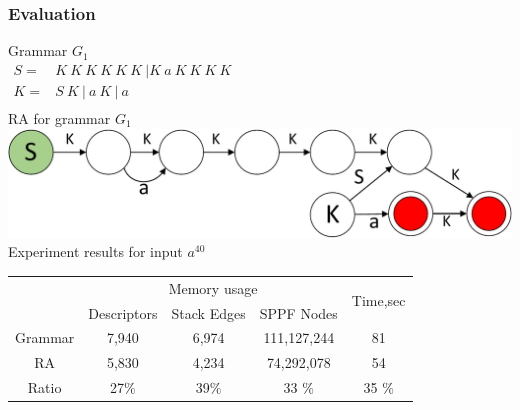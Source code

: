 \documentclass{beamer}
\begin{document}
	\begin{frame} 
		\frametitle{Evaluation}
		\begin{center}
		\vspace{-10pt}
		Grammar $G_1$\\
		\vspace{6pt}
		$
		\begin{array}{rl}
		S =& K\ K\ K\ K\ K\ K \ | K\ a\ K\ K\ K\ K \\
		K =& S\ K\ |\ a\ K\ |\ a \\
		\end{array}
		$
		\\
		\vspace{10pt}
		RA for grammar $G_1$
		\\
		\vspace{6pt}
		\includegraphics[scale=.5]{pictures/G1automaton.pdf}
		\\
		\vspace{7pt}
		Experiment results for input $a^{40}$
		\\
		\vspace{2pt}
		\begin{tabular}{ | c | c | c | c | c | }
			\hline
			\multirow{2}{*}[-1ex]{} &\multicolumn{3}{c|}{Memory usage} & \multirow{2}{*}[-1ex]{Time,sec} \\
			\cline{2-4}
             &  Descriptors & Stack Edges & SPPF Nodes &    \\ \hline
			Grammar  &  7,940        & 6,974      & 111,127,244 & 81 \\ \hline
		     RA &  5,830        & 4,234      & 74,292,078  & 54 \\ \hline \hline
			Ratio   &  27$\%$       & 39$\%$     & 33 $\%$ & 35 $\%$    \\ \hline
		\end{tabular}
		\end{center}
	\end{frame}
	
\end{document}
